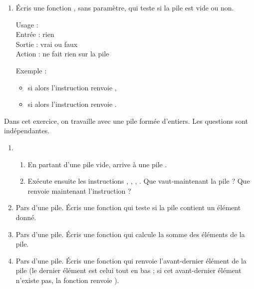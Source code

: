 \documentclass[11pt,class=report,crop=false]{standalone}
\begin{document}
\begin{activite}
\begin{enumerate}
  \item Écris une fonction , sans paramètre, qui teste si la pile est vide ou non. 
  
  \begin{fonction}
  Usage :  \\
  Entrée : rien \\
  Sortie : vrai ou faux \\
  Action : ne fait rien sur la pile
  
  \medskip
    
  Exemple : 
  \begin{itemize}
    \item si  alors l'instruction  renvoie ,
    \item si  alors l'instruction  renvoie .
  \end{itemize}
  \end{fonction}
\end{enumerate} 
\end{activite}





\begin{activite}


Dans cet exercice, on travaille avec une pile formée d'entiers. Les questions sont indépendantes.

\begin{enumerate}
  \item 
  \begin{enumerate}
    \item En partant d'une pile vide, arrive à une pile \ci{[5,7,2,4]}.
    \item Exécute ensuite les instructions , , , . Que vaut-maintenant la pile ? Que renvoie maintenant l'instruction  ?
\end{enumerate}  

  \item Pars d'une pile. Écris une fonction  qui teste si la pile contient un élément donné.
  
  \item Pars d'une pile. Écris une fonction qui calcule la somme des éléments de la pile. 
  
  \item Pars d'une pile. Écris une fonction qui renvoie l'avant-dernier élément de la pile (le dernier élément est celui tout en bas ; si cet avant-dernier élément n'existe pas, la fonction renvoie ). 
  
\end{enumerate} 
\end{activite}
\end{document}
